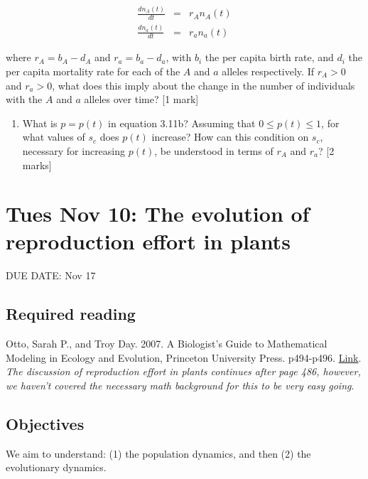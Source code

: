 \documentclass[]{book}
\providecommand{\tightlist}{%
  \setlength{\itemsep}{0pt}\setlength{\parskip}{0pt}}
\begin{document}
\begin{eqnarray}
\frac{dn_A(t)}{dt} & = & r_A n_A(t) \\
\frac{dn_a(t)}{dt} & = & r_a n_a(t)
\end{eqnarray}

where \(r_A = b_A - d_A\) and \(r_a = b_a - d_a\), with \(b_i\) the per
capita birth rate, and \(d_i\) the per capita mortality rate for each of
the \(A\) and \(a\) alleles respectively. If \(r_A > 0\) and
\(r_a > 0\), what does this imply about the change in the number of
individuals with the \(A\) and \(a\) alleles over time? {[}1 mark{]}

\begin{enumerate}
\def\labelenumi{\arabic{enumi}.}
\setcounter{enumi}{11}
\tightlist
\item
  What is \(p=p(t)\) in equation 3.11b? Assuming that
  \(0 \leq p(t) \leq 1\), for what values of \(s_c\) does \(p(t)\)
  increase? How can this condition on \(s_c\), necessary for increasing
  \(p(t)\), be understood in terms of \(r_A\) and \(r_a\)? {[}2 marks{]}
\end{enumerate}

\chapter{Tues Nov 10: The evolution of reproduction effort in
plants}\label{tues-nov-10-the-evolution-of-reproduction-effort-in-plants}

DUE DATE: Nov 17

\section{Required reading}\label{required-reading}

Otto, Sarah P., and Troy Day. 2007. A Biologist's Guide to Mathematical
Modeling in Ecology and Evolution, Princeton University Press.
p494-p496.
\href{https://ebookcentral-proquest-com.qe2a-proxy.mun.ca/lib/MUN/detail.action?docID=768551}{Link}.
\emph{The discussion of reproduction effort in plants continues after
page 486, however, we haven't covered the necessary math background for
this to be very easy going}.

\section{Objectives}\label{objectives}

We aim to understand: (1) the population dynamics, and then (2) the
evolutionary dynamics.
\end{document}
